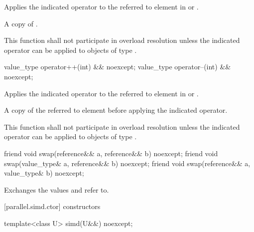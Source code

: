 \begin{itemdescr}
  \pnum\effects
  Applies the indicated operator to the referred to element in  or .

  \pnum\returns
  A copy of .

  \pnum\remarks
  This function shall not participate in overload resolution unless the indicated operator can be applied to objects of type .
\end{itemdescr}

\begin{itemdecl}
value_type operator++(int) && noexcept;
value_type operator--(int) && noexcept;
\end{itemdecl}

\begin{itemdescr}
  \pnum\effects
  Applies the indicated operator to the referred to element in  or .

  \pnum\returns
  A copy of the referred to element before applying the indicated operator.

  \pnum\remarks
  This function shall not participate in overload resolution unless the indicated operator can be applied to objects of type .
\end{itemdescr}

\begin{itemdecl}
friend void swap(reference&& a, reference&& b) noexcept;
friend void swap(value_type& a, reference&& b) noexcept;
friend void swap(reference&& a, value_type& b) noexcept;
\end{itemdecl}

\begin{itemdescr}
  \pnum\effects
  Exchanges the values  and  refer to.
\end{itemdescr}

[parallel.simd.ctor]{ constructors}

\begin{itemdecl}
template<class U> simd(U&&) noexcept;
\end{itemdecl}

